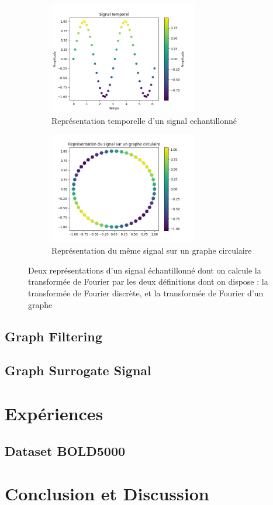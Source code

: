\documentclass[11pt]{article}
\begin{document}
\begin{figure}[h]
  \centering
  \begin{subfigure}{0.35\linewidth}
    \includegraphics[width=6.5cm]{img/temporal_signal.png}
    \caption{Représentation temporelle d'un signal echantillonné}
    \label{fig:DANN_1}
  \end{subfigure}
  \hspace{1.5cm}
  \begin{subfigure}{0.35\linewidth}
    \includegraphics[width=6.5cm]{img/graph_signal.png}
    \caption{Représentation du même signal sur un graphe circulaire}
    \label{fig:DANN_2}
  \end{subfigure}
  \caption{Deux représentations d'un signal échantillonné dont on calcule la transformée de Fourier par les deux définitions dont on dispose : la transformée de Fourier discrète, et la transformée de Fourier d'un graphe}
  \label{fig:DANN}
\end{figure}

\subsection{Graph Filtering}

\subsection{Graph Surrogate Signal}

\section{Expériences}

\subsection{Dataset BOLD5000}


\section{Conclusion et Discussion}
\end{document}
